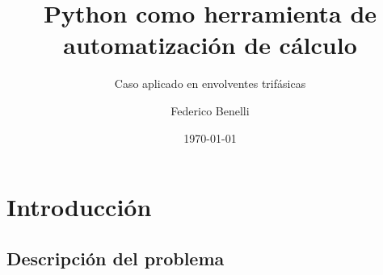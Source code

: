 \documentclass[aspectratio=1610,multi,rgb]{beamer}
\title{Python como herramienta de automatización de cálculo}
\subtitle{Caso aplicado en envolventes trifásicas}
\author{Federico Benelli}
\institute{IPQA}
\date{\today}
\begin{document}
\nocite{*} %

\begin{frame}\maketitle\end{frame}
\begin{frame}\tableofcontents\end{frame}

\section{Introducción}\label{intro}
\subsection{Descripción del problema}\label{prob}
\end{document}
